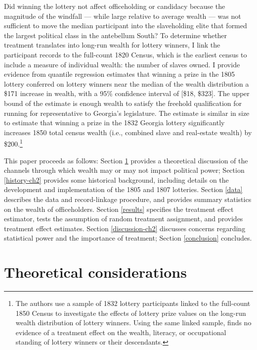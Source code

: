 Did winning the lottery not affect officeholding or candidacy because the magnitude of the windfall --- while large relative to average wealth --- was not sufficient to move the median participant into the slaveholding elite that formed the largest political class in the antebellum South? To determine  whether treatment translates into long-run wealth for lottery winners, I link the participant records to the full-count 1820 Census, which is the earliest census to include a measure of individual wealth: the number of slaves owned. I provide evidence from quantile regression estimates that winning a prize in the 1805 lottery conferred on lottery winners near the median of the wealth distribution a \$171 increase in wealth, with a 95\% confidence interval of [\$18, \$323]. The upper bound of the estimate is enough wealth to satisfy the freehold qualification for running for representative to Georgia's legislature. The estimate is similar in size to  estimate that winning a prize in the 1832 Georgia lottery significantly increases 1850 total census wealth (i.e., combined slave and real-estate wealth) by \$200.\footnote{The authors use a sample of 1832 lottery participants linked to the full-count 1850 Census to investigate the effects of lottery prize values on the long-run wealth distribution of lottery winners. Using the same linked sample, \citet{bleakley2016} finds no evidence of a treatment effect on the wealth, literacy, or occupational standing of lottery winners or their descendants.} 

This paper proceeds as follows: Section \ref{theory} provides a theoretical discussion of the channels through which wealth may or may not impact political power; Section \ref{history-ch2} provides some historical background, including details on the development and implementation of the 1805 and 1807 lotteries. Section \ref{data} describes the data and record-linkage procedure, and provides summary statistics on the wealth of officeholders. Section \ref{results} specifies the treatment effect estimator, tests the assumption of random treatment assignment, and provides treatment effect estimates. Section \ref{discussion-ch2} discusses concerns regarding statistical power and the importance of treatment; Section \ref{conclusion} concludes.

\section{Theoretical considerations} \label{theory} 

